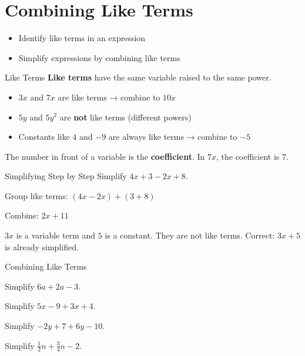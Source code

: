 \section{Combining Like Terms}

\begin{learningGoals}
\begin{itemize}
    \item Identify like terms in an expression
    \item Simplify expressions by combining like terms
\end{itemize}
\end{learningGoals}

\begin{conceptBox}{Like Terms}
\textbf{Like terms} have the same variable raised to the same power.
\begin{itemize}[leftmargin=*]
    \item $3x$ and $7x$ are like terms → combine to $10x$
    \item $5y$ and $5y^2$ are \textbf{not} like terms (different powers)
    \item Constants like $4$ and $-9$ are always like terms → combine to $-5$
\end{itemize}
The number in front of a variable is the \textbf{coefficient}. In $7x$, the coefficient is $7$.
\end{conceptBox}

\begin{workedExample}{Simplifying Step by Step}
Simplify $4x + 3 - 2x + 8$.

Group like terms: $(4x - 2x) + (3 + 8)$

Combine: $2x + 11$
\end{workedExample}

\begin{errorBox}
$3x$ is a variable term and $5$ is a constant. They are not like terms.
Correct: $3x + 5$ is already simplified.
\end{errorBox}

\begin{practiceBox}{Combining Like Terms}
\resetProblems

\prob Simplify $6a + 2a - 3$.

\prob Simplify $5x - 9 + 3x + 4$.

\prob Simplify $-2y + 7 + 6y - 10$.

\prob Simplify $\frac{1}{2}n + \frac{3}{4}n - 2$.


\end{practiceBox}
